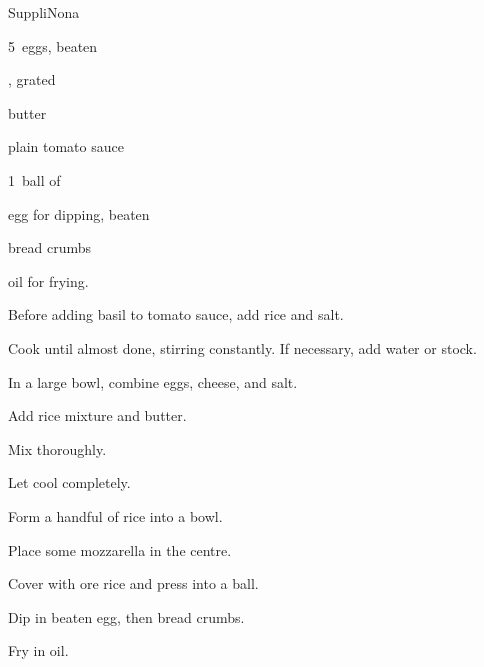 \begin{recipe}{Suppli}{Nona}{}

\begin{ingredients}
\item {} 
\item 5~eggs, beaten
\item {}, grated
\item \C{\quarter} butter
\item plain tomato sauce
\item 1~ball of 
\item egg for dipping, beaten
\item bread crumbs
\item oil for frying.
\end{ingredients}

\begin{directions}
\item Before adding basil to tomato sauce, add rice and salt.
\item Cook until almost done, stirring constantly. If necessary, add water or stock. 
\item In a large bowl, combine eggs, cheese, and salt.
\item Add rice mixture and butter.
\item Mix thoroughly.
\item Let cool completely.
\item Form a handful of rice into a bowl.
\item Place some mozzarella in the centre.
\item Cover with ore rice and press into a ball.
\item Dip in beaten egg, then bread crumbs.
\item Fry in oil.
\end{directions}

\end{recipe}
